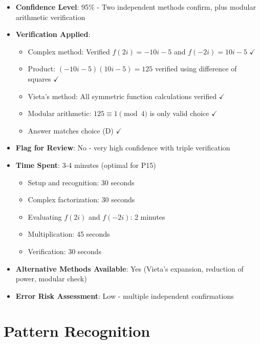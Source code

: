 \documentclass[12pt]{article}
\begin{document}
\begin{itemize}[leftmargin=*]
    \item \textbf{Confidence Level}: 95\% - Two independent methods confirm, plus modular arithmetic verification
    
    \item \textbf{Verification Applied}: 
    \begin{itemize}
        \item Complex method: Verified $f(2i) = -10i - 5$ and $f(-2i) = 10i - 5$ $\checkmark$
        \item Product: $(-10i-5)(10i-5) = 125$ verified using difference of squares $\checkmark$
        \item Vieta's method: All symmetric function calculations verified $\checkmark$
        \item Modular arithmetic: $125 \equiv 1 \pmod{4}$ is only valid choice $\checkmark$
        \item Answer matches choice (D) $\checkmark$
    \end{itemize}
    
    \item \textbf{Flag for Review}: No - very high confidence with triple verification
    
    \item \textbf{Time Spent}: 3-4 minutes (optimal for P15)
    \begin{itemize}
        \item Setup and recognition: 30 seconds
        \item Complex factorization: 30 seconds
        \item Evaluating $f(2i)$ and $f(-2i)$: 2 minutes
        \item Multiplication: 45 seconds
        \item Verification: 30 seconds
    \end{itemize}
    
    \item \textbf{Alternative Methods Available}: Yes (Vieta's expansion, reduction of power, modular check)
    
    \item \textbf{Error Risk Assessment}: Low - multiple independent confirmations
\end{itemize}

\section*{Pattern Recognition}
\end{document}
